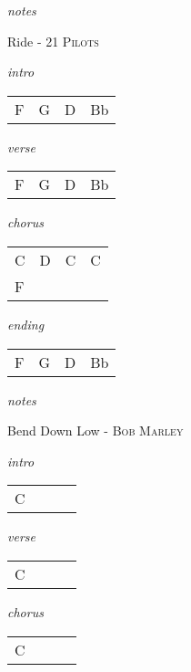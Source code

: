 \documentclass[12pt]{article}
\begin{document}
\textit{notes}

\newpage

{\Huge Ride} {\huge - \textsc{21 Pilots}}

\huge
\textit{intro}

\begin{tabular}{|P{1.25in}|P{1.25in}|P{1.25in}|P{1.25in}|}
  F & G  &  D &  Bb \\
\end{tabular}

\textit{verse}

\begin{tabular}{|P{1.25in}|P{1.25in}|P{1.25in}|P{1.25in}|}
  F & G  &  D &  Bb \\
\end{tabular}

\textit{chorus}

\begin{tabular}{|P{1.25in}|P{1.25in}|P{1.25in}|P{1.25in}|}
  C &  D &   C &  C  \\
  F &    &     &     \\
  
\end{tabular}

\textit{ending}

\begin{tabular}{|P{1.25in}|P{1.25in}|P{1.25in}|P{1.25in}|}
  F &  G & D  &  Bb \\
\end{tabular}

\textit{notes}

\newpage

{\Huge Bend Down Low} {\huge - \textsc{Bob Marley}}

\huge
\textit{intro}

\begin{tabular}{|P{1.25in}|P{1.25in}|P{1.25in}|P{1.25in}|}
  C &   &   &   \\
\end{tabular}

\textit{verse}

\begin{tabular}{|P{1.25in}|P{1.25in}|P{1.25in}|P{1.25in}|}
  C &   &   &   \\
\end{tabular}

\textit{chorus}

\begin{tabular}{|P{1.25in}|P{1.25in}|P{1.25in}|P{1.25in}|}
  C &   &   &   \\
\end{tabular}
\end{document}
